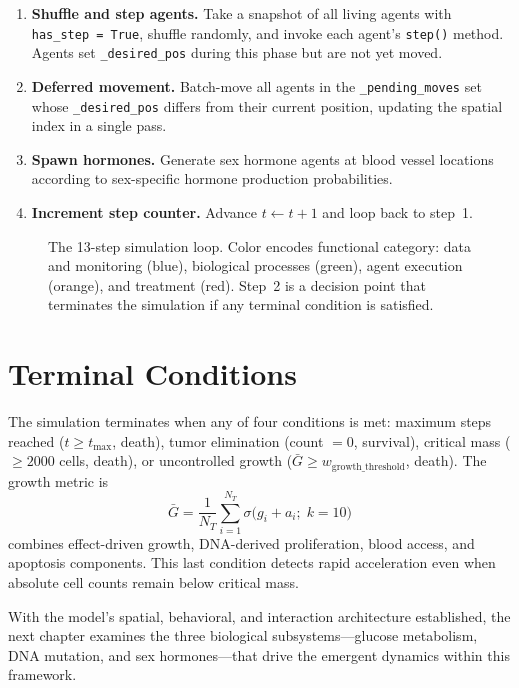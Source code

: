 \begin{enumerate}
    \item \textbf{Shuffle and step agents.}  Take a snapshot of all living agents with \texttt{has\_step = True}, shuffle randomly, and invoke each agent's \texttt{step()} method.  Agents set \texttt{\_desired\_pos} during this phase but are not yet moved.

    \item \textbf{Deferred movement.}  Batch-move all agents in the \texttt{\_pending\_moves} set whose \texttt{\_desired\_pos} differs from their current position, updating the spatial index in a single pass.

    \item \textbf{Spawn hormones.}  Generate sex hormone agents at blood vessel locations according to sex-specific hormone production probabilities.

    \item \textbf{Increment step counter.}  Advance $t \leftarrow t + 1$ and loop back to step~1.
\end{enumerate}

\begin{figure}[htbp]
\centering
{}
\caption{The 13-step simulation loop.  Color encodes functional category: data and monitoring (blue), biological processes (green), agent execution (orange), and treatment (red).  Step~2 is a decision point that terminates the simulation if any terminal condition is satisfied.}
\label{fig:simulation_pipeline}
\end{figure}

\section{Terminal Conditions}
\label{sec:md_terminal}

The simulation terminates when any of four conditions is met: maximum steps reached ($t \geq t_{\max}$, death), tumor elimination (count $= 0$, survival), critical mass ($\geq 2000$ cells, death), or uncontrolled growth ($\bar{G} \geq w_{\text{growth\_threshold}}$, death).  The growth metric is
\begin{equation}
    \bar{G} = \frac{1}{N_T} \sum_{i=1}^{N_T} \sigma\bigl(g_i + a_i;\; k{=}10\bigr)
    \label{eq:growth_rate}
\end{equation}
combines effect-driven growth, DNA-derived proliferation, blood access, and apoptosis components.  This last condition detects rapid acceleration even when absolute cell counts remain below critical mass.

With the model's spatial, behavioral, and interaction architecture established, the next chapter examines the three biological subsystems---glucose metabolism, DNA mutation, and sex hormones---that drive the emergent dynamics within this framework.
